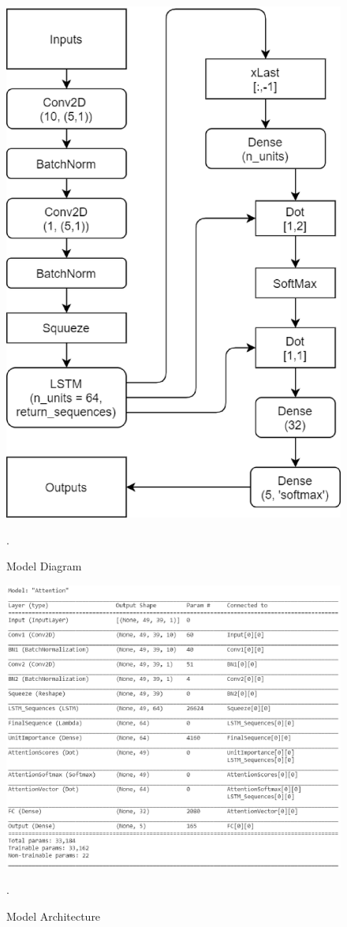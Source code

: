 \documentclass[11pt,english]{article}
\begin{document}
%
\begin{figure}[!ht]
\centering
\includegraphics[width=\columnwidth]{./Figs/Model.eps}
\caption{ Model Diagram}.
\label{fig: Model}	
\end{figure}

\onecolumn

\begin{figure}[!ht]
\centering
\includegraphics[width=\columnwidth]{./Figs/Architecture.eps}
\caption{ Model Architecture}.
\label{fig: Architecture}	
\end{figure}
\end{document}
